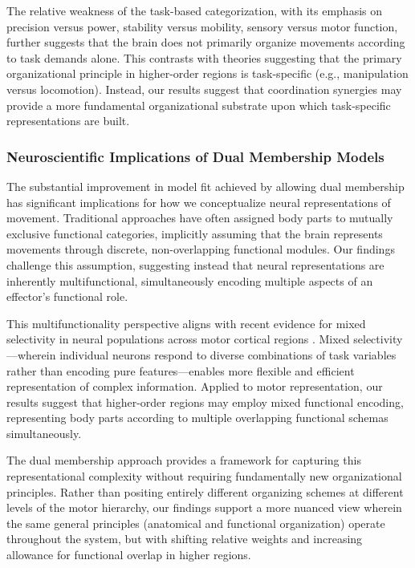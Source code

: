 \documentclass{article}
\begin{document}
The relative weakness of the task-based categorization, with its emphasis on precision versus power, stability versus mobility, sensory versus motor function, further suggests that the brain does not primarily organize movements according to task demands alone. This contrasts with theories suggesting that the primary organizational principle in higher-order regions is task-specific (e.g., manipulation versus locomotion). Instead, our results suggest that coordination synergies may provide a more fundamental organizational substrate upon which task-specific representations are built.

\subsubsection{Neuroscientific Implications of Dual Membership Models}

The substantial improvement in model fit achieved by allowing dual membership has significant implications for how we conceptualize neural representations of movement. Traditional approaches have often assigned body parts to mutually exclusive functional categories, implicitly assuming that the brain represents movements through discrete, non-overlapping functional modules. Our findings challenge this assumption, suggesting instead that neural representations are inherently multifunctional, simultaneously encoding multiple aspects of an effector's functional role.

This multifunctionality perspective aligns with recent evidence for mixed selectivity in neural populations across motor cortical regions \citep{Fusi2016}. Mixed selectivity—wherein individual neurons respond to diverse combinations of task variables rather than encoding pure features—enables more flexible and efficient representation of complex information. Applied to motor representation, our results suggest that higher-order regions may employ mixed functional encoding, representing body parts according to multiple overlapping functional schemas simultaneously.

The dual membership approach provides a framework for capturing this representational complexity without requiring fundamentally new organizational principles. Rather than positing entirely different organizing schemes at different levels of the motor hierarchy, our findings support a more nuanced view wherein the same general principles (anatomical and functional organization) operate throughout the system, but with shifting relative weights and increasing allowance for functional overlap in higher regions.
\end{document}
